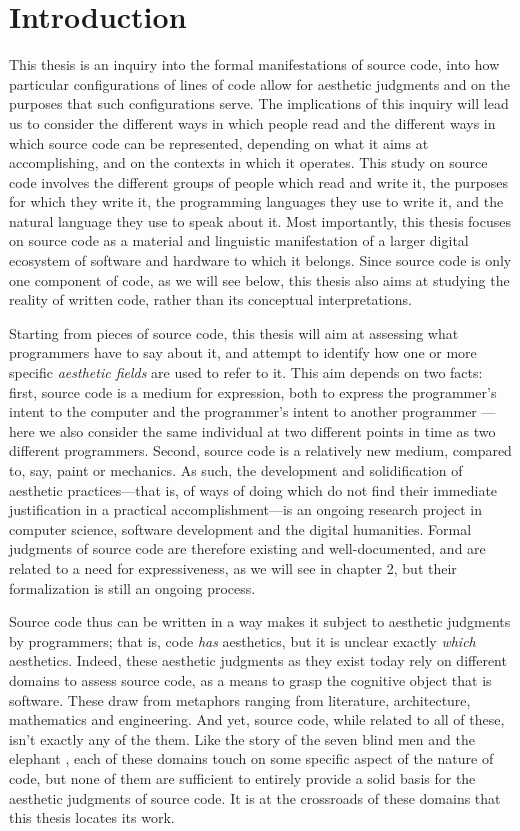 \chapter{Introduction}

This thesis is an inquiry into the formal manifestations of source code, into how particular configurations of lines of code allow for aesthetic judgments and on the purposes that such configurations serve. The implications of this inquiry will lead us to consider the different ways in which people read and the different ways in which source code can be represented, depending on what it aims at accomplishing, and on the contexts in which it operates.
This study on source code involves the different groups of people which read and write it, the purposes for which they write it, the programming languages they use to write it, and the natural language they use to speak about it. Most importantly, this thesis focuses on source code as a material and linguistic manifestation of a larger digital ecosystem of software and hardware to which it belongs. Since source code is only one component of code, as we will see below, this thesis also aims at studying the reality of written code, rather than its conceptual interpretations.

Starting from pieces of source code, this thesis will aim at assessing what programmers have to say about it, and attempt to identify how one or more specific \emph{aesthetic fields} are used to refer to it. This aim depends on two facts: first, source code is a medium for expression, both to express the programmer's intent to the computer \citep{dijkstra_craftsman_1982} and the programmer's intent to another programmer \citep{abelson_structure_1979}—here we also consider the same individual at two different points in time as two different programmers. Second, source code is a relatively new medium, compared to, say, paint or mechanics. As such, the development and solidification of aesthetic practices—that is, of ways of doing which do not find their immediate justification in a practical accomplishment—is an ongoing research project in computer science, software development and the digital humanities. Formal judgments of source code are therefore existing and well-documented, and are related to a need for expressiveness, as we will see in chapter 2, but their formalization is still an ongoing process.

Source code thus can be written in a way makes it subject to aesthetic judgments by programmers; that is, code \emph{has} aesthetics, but it is unclear exactly \emph{which} aesthetics. Indeed, these aesthetic judgments as they exist today rely on different domains to assess source code, as a means to grasp the cognitive object that is software. These draw from metaphors ranging from literature, architecture, mathematics and engineering. And yet, source code, while related to all of these, isn't exactly any of the them. Like the story of the seven blind men and the elephant \citep{chun_sourcery_2008}, each of these domains touch on some specific aspect of the nature of code, but none of them are sufficient to entirely provide a solid basis for the aesthetic judgments of source code. It is at the crossroads of these domains that this thesis locates its work.


